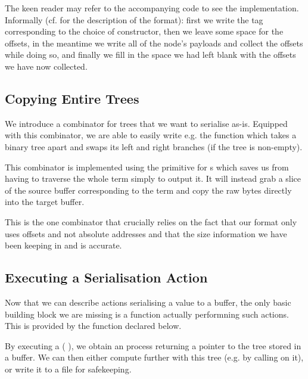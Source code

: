 The keen reader may refer to the accompanying code to see the implementation.
Informally (cf.  for the description of the format):
first we write the tag corresponding to the choice of constructor,
then we leave some space for the offsets,
in the meantime we write all of the node's payloads and collect the offsets while doing so,
and finally we fill in the space we had left blank with the offsets we have now collected.

\subsection{Copying Entire Trees}

We introduce a  combinator for trees that we want to
serialise as-is.
%
Equipped with this combinator, we are able to easily write e.g.
the  function which takes a binary tree apart
and swaps its left and right branches (if the tree is non-empty).



This combinator is implemented using the  primitive
for s which saves us from having to traverse the whole term
simply to output it.
%
It will instead grab a slice of the source buffer corresponding to the term
and copy the raw bytes directly into the target buffer.


This is the one combinator that crucially relies on the fact that our format
only uses offsets and not absolute addresses
and that the size information we have been keeping in  and
 is accurate.

\subsection{Executing a Serialisation Action}

Now that we can describe actions serialising a value to a buffer,
the only basic building block we are missing is a function actually
performning such actions.
%
This is provided by the  function
declared below.


By executing a (  ), we
obtain an  process returning a pointer to the tree 
stored in a buffer.
%
We can then either compute further with this tree (e.g. by calling
 on it), or write it to a file for safekeeping.

